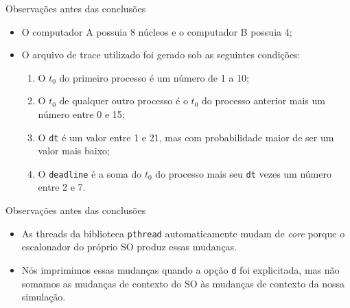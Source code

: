 \documentclass[10pt]{beamer}
\begin{document}
    \begin{frame}{Observações antes das conclusões}
        \begin{itemize}
            \justifying
            \item O computador A possuia 8 núcleos e o computador B possuia 4;
            \item O arquivo de trace utilizado foi gerado sob as seguintes condições:
                \begin{enumerate}
                    \item O $t_0$ do primeiro processo é um número de 1 a 10;
                    \item O $t_0$ de qualquer outro processo é o $t_0$ do processo
                        anterior mais um número entre 0 e 15;
                    \item O \texttt{dt} é um valor entre 1 e 21, mas com probabilidade
                        maior de ser um valor mais baixo;
                    \item O \texttt{deadline} é a soma do $t_0$ do processo
                        mais seu \texttt{dt} vezes um número entre 2 e 7.
                \end{enumerate}
        \end{itemize}
    \end{frame}

    \begin{frame}{Observações antes das conclusões}
        \begin{itemize}
            \justifying
            \item As threads da biblioteca \texttt{pthread} automaticamente mudam
                de \textit{core} porque o escalonador do próprio SO produz essas
                mudanças.
            \item Nós imprimimos essas mudanças quando a opção \texttt{d} foi
                explicitada, mas não somamos as mudanças de contexto do SO às
                mudanças de contexto da nossa simulação.
        \end{itemize}
    \end{frame}
\end{document}
